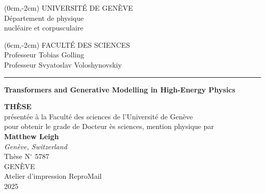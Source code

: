 \begin{titlepage}
    \thispagestyle{empty}

    \begin{textblock*}{10cm}(0cm,-2cm)
        UNIVERSIT\'E DE GEN\`EVE \\  D\'epartement de physique \\
        nucl\'eaire et corpusculaire\\[-0.1em]
    \end{textblock*}
    \begin{textblock*}{10cm}(6cm,-2cm)
        \raggedleft
        FACULT\'E DES SCIENCES \\
        Professeur Tobias Golling\\
        Professeur Svyatoslav Voloshynovskiy\\[-0.1em]
    \end{textblock*}
    \rule{16cm}{1pt}

    \begin{center}

        \vskip1.0in
        \Large{
            \begin{boldmath}
                {\textbf{Transformers and Generative Modelling
                        in High-Energy Physics}} \\
            \end{boldmath}

        }
        \vskip0.57in
        \Large{
            {\bf TH\`ESE} \\
        }
        \large{
            \vskip0.44in
            pr\'esent\'ee \`a la Facult\'e des sciences de
            l'Universit\'e de Gen\`eve \\
            pour obtenir le grade de Docteur \`es sciences, mention
            physique
            \vskip0.44in
        }
        par \\
        \vskip0.44in
        \Large{
            {\textbf{Matthew Leigh}} \\
        }
        \vskip0.2in
        \Large{
            {\emph{Genève, Switzerland} \\
                }}
        \vskip1.2in
        Th\`ese N$^\circ$ 5787\\
        \vskip1.6in
        \large{
            GEN\`EVE \\ Atelier d'impression ReproMail \\ 2025\\}
        \vskip0.6in

    \end{center}
\end{titlepage}

